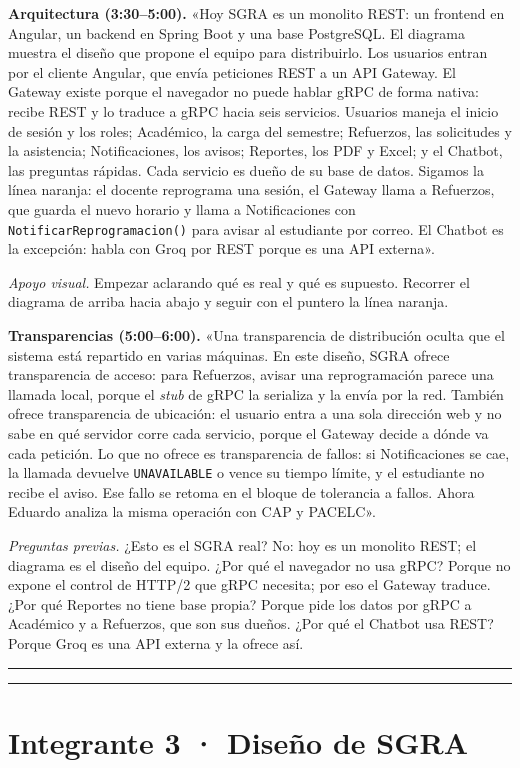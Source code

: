 \documentclass[10pt,a4paper]{article}
\newcommand{\espacionota}{%
  \par\noindent\rule[-1.2ex]{\linewidth}{.25pt}\par
  \noindent\rule[-1.2ex]{\linewidth}{.25pt}\par}
\begin{document}
\textbf{Arquitectura (3:30--5:00).}
«Hoy SGRA es un monolito REST: un frontend en Angular, un backend en Spring Boot y una base PostgreSQL. El diagrama muestra el diseño que propone el equipo para distribuirlo. Los usuarios entran por el cliente Angular, que envía peticiones REST a un API Gateway. El Gateway existe porque el navegador no puede hablar gRPC de forma nativa: recibe REST y lo traduce a gRPC hacia seis servicios. Usuarios maneja el inicio de sesión y los roles; Académico, la carga del semestre; Refuerzos, las solicitudes y la asistencia; Notificaciones, los avisos; Reportes, los PDF y Excel; y el Chatbot, las preguntas rápidas. Cada servicio es dueño de su base de datos. Sigamos la línea naranja: el docente reprograma una sesión, el Gateway llama a Refuerzos, que guarda el nuevo horario y llama a Notificaciones con \texttt{NotificarReprogramacion()} para avisar al estudiante por correo. El Chatbot es la excepción: habla con Groq por REST porque es una API externa».
\cite{front,back}

\textit{Apoyo visual.} Empezar aclarando qué es real y qué es supuesto. Recorrer el diagrama de arriba hacia abajo y seguir con el puntero la línea naranja.

\textbf{Transparencias (5:00--6:00).}
«Una transparencia de distribución oculta que el sistema está repartido en varias máquinas. En este diseño, SGRA ofrece transparencia de acceso: para Refuerzos, avisar una reprogramación parece una llamada local, porque el \emph{stub} de gRPC la serializa y la envía por la red. También ofrece transparencia de ubicación: el usuario entra a una sola dirección web y no sabe en qué servidor corre cada servicio, porque el Gateway decide a dónde va cada petición. Lo que no ofrece es transparencia de fallos: si Notificaciones se cae, la llamada devuelve \texttt{UNAVAILABLE} o vence su tiempo límite, y el estudiante no recibe el aviso. Ese fallo se retoma en el bloque de tolerancia a fallos. Ahora Eduardo analiza la misma operación con CAP y PACELC».
\cite{kaminski2023}

\textit{Preguntas previas.} ¿Esto es el SGRA real? No: hoy es un monolito REST; el diagrama es el diseño del equipo. ¿Por qué el navegador no usa gRPC? Porque no expone el control de HTTP/2 que gRPC necesita; por eso el Gateway traduce. ¿Por qué Reportes no tiene base propia? Porque pide los datos por gRPC a Académico y a Refuerzos, que son sus dueños. ¿Por qué el Chatbot usa REST? Porque Groq es una API externa y la ofrece así.
\espacionota

\section*{Integrante 3 · Diseño de SGRA}
\end{document}
